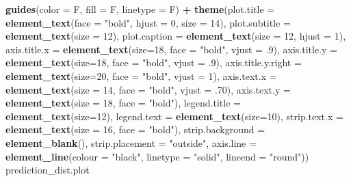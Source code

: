 \documentclass[
]{article}
\newenvironment{Shaded}{\begin{snugshade}}{\end{snugshade}}
\newcommand{\DataTypeTok}[1]{\textcolor[rgb]{0.13,0.29,0.53}{#1}}
\newcommand{\DecValTok}[1]{\textcolor[rgb]{0.00,0.00,0.81}{#1}}
\newcommand{\FloatTok}[1]{\textcolor[rgb]{0.00,0.00,0.81}{#1}}
\newcommand{\KeywordTok}[1]{\textcolor[rgb]{0.13,0.29,0.53}{\textbf{#1}}}
\newcommand{\NormalTok}[1]{#1}
\newcommand{\OperatorTok}[1]{\textcolor[rgb]{0.81,0.36,0.00}{\textbf{#1}}}
\newcommand{\StringTok}[1]{\textcolor[rgb]{0.31,0.60,0.02}{#1}}
\begin{document}
\begin{Shaded}
\begin{Highlighting}[]
\StringTok{  }\KeywordTok{guides}\NormalTok{(}\DataTypeTok{color =}\NormalTok{ F, }\DataTypeTok{fill =}\NormalTok{ F, }\DataTypeTok{linetype =}\NormalTok{ F) }\OperatorTok{+}
\StringTok{  }\KeywordTok{theme}\NormalTok{(}\DataTypeTok{plot.title =} \KeywordTok{element_text}\NormalTok{(}\DataTypeTok{face =} \StringTok{"bold"}\NormalTok{, }\DataTypeTok{hjust =} \DecValTok{0}\NormalTok{, }\DataTypeTok{size =} \DecValTok{14}\NormalTok{), }
          \DataTypeTok{plot.subtitle =} \KeywordTok{element_text}\NormalTok{(}\DataTypeTok{size =} \DecValTok{12}\NormalTok{),}
          \DataTypeTok{plot.caption =} \KeywordTok{element_text}\NormalTok{(}\DataTypeTok{size =} \DecValTok{12}\NormalTok{, }\DataTypeTok{hjust =} \DecValTok{1}\NormalTok{),}
          \DataTypeTok{axis.title.x =} \KeywordTok{element_text}\NormalTok{(}\DataTypeTok{size=}\DecValTok{18}\NormalTok{, }\DataTypeTok{face =} \StringTok{"bold"}\NormalTok{, }\DataTypeTok{vjust =} \FloatTok{.9}\NormalTok{),}
          \DataTypeTok{axis.title.y =} \KeywordTok{element_text}\NormalTok{(}\DataTypeTok{size=}\DecValTok{18}\NormalTok{, }\DataTypeTok{face =} \StringTok{"bold"}\NormalTok{, }\DataTypeTok{vjust =} \FloatTok{.9}\NormalTok{),}
          \DataTypeTok{axis.title.y.right =} \KeywordTok{element_text}\NormalTok{(}\DataTypeTok{size=}\DecValTok{20}\NormalTok{, }\DataTypeTok{face =} \StringTok{"bold"}\NormalTok{, }\DataTypeTok{vjust =} \DecValTok{1}\NormalTok{),}
          \DataTypeTok{axis.text.x =} \KeywordTok{element_text}\NormalTok{(}\DataTypeTok{size =} \DecValTok{14}\NormalTok{, }\DataTypeTok{face =} \StringTok{"bold"}\NormalTok{, }\DataTypeTok{vjust =} \FloatTok{.70}\NormalTok{),}
          \DataTypeTok{axis.text.y =} \KeywordTok{element_text}\NormalTok{(}\DataTypeTok{size =} \DecValTok{18}\NormalTok{, }\DataTypeTok{face =} \StringTok{"bold"}\NormalTok{),}
          \DataTypeTok{legend.title =} \KeywordTok{element_text}\NormalTok{(}\DataTypeTok{size=}\DecValTok{12}\NormalTok{), }
          \DataTypeTok{legend.text =} \KeywordTok{element_text}\NormalTok{(}\DataTypeTok{size=}\DecValTok{10}\NormalTok{),}
          \DataTypeTok{strip.text.x =} \KeywordTok{element_text}\NormalTok{(}\DataTypeTok{size =} \DecValTok{16}\NormalTok{, }\DataTypeTok{face =} \StringTok{"bold"}\NormalTok{),}
          \DataTypeTok{strip.background =} \KeywordTok{element_blank}\NormalTok{(),}
          \DataTypeTok{strip.placement =} \StringTok{"outside"}\NormalTok{,}
          \DataTypeTok{axis.line =} \KeywordTok{element_line}\NormalTok{(}\DataTypeTok{colour =} \StringTok{"black"}\NormalTok{, }\DataTypeTok{linetype =} \StringTok{"solid"}\NormalTok{, }\DataTypeTok{lineend =} \StringTok{"round"}\NormalTok{)) }
\NormalTok{prediction_dist.plot}
\end{Highlighting}
\end{Shaded}
\end{document}
